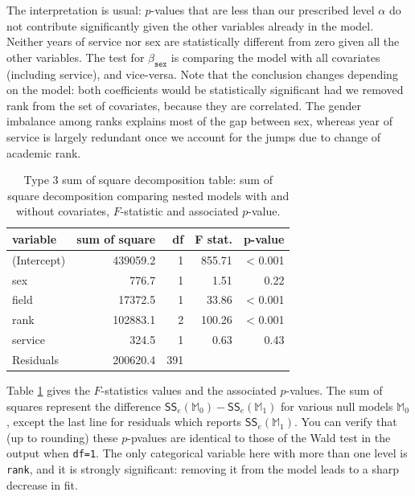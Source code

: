 \documentclass[
  11pt,
  letterpaper,
]{book}
\theoremstyle{definition}
\theoremstyle{definition}
\theoremstyle{definition}
\theoremstyle{remark}
\begin{document}
The interpretation is usual: \(p\)-values that are less than our prescribed level \(\alpha\) do not contribute significantly given the other variables already in the model. Neither years of service nor sex are statistically different from zero given all the other variables. The test for \(\beta_{\texttt{sex}}\) is comparing the model with all covariates (including service), and vice-versa. Note that the conclusion changes depending on the model: both coefficients would be statistically significant had we removed rank from the set of covariates, because they are correlated. The gender imbalance among ranks explains most of the gap between sex, whereas year of service is largely redundant once we account for the jumps due to change of academic rank.

\begin{table}

\caption{\label{tab:summaryanovalmcollege}Type 3 sum of square decomposition table: sum of square decomposition comparing nested models with and without covariates, $F$-statistic and associated $p$-value.}
\centering
\begin{tabular}[t]{lrrrr}
\toprule
variable & sum of square & df & F stat. & p-value\\
\midrule
(Intercept) & 439059.2 & 1 & 855.71 & < 0.001\\
sex & 776.7 & 1 & 1.51 & 0.22\\
field & 17372.5 & 1 & 33.86 & < 0.001\\
rank & 102883.1 & 2 & 100.26 & < 0.001\\
service & 324.5 & 1 & 0.63 & 0.43\\
\addlinespace
Residuals & 200620.4 & 391 &  & \\
\bottomrule
\end{tabular}
\end{table}

Table \ref{tab:summaryanovalmcollege} gives the \(F\)-statistics values and the associated \(p\)-values. The sum of squares represent the difference \(\mathsf{SS}_e(\mathbb{M}_0)-\mathsf{SS}_e(\mathbb{M}_1)\) for various null models \(\mathbb{M}_0\), except the last line for residuals which reports \(\mathsf{SS}_e(\mathbb{M}_1)\). You can verify that (up to rounding) these \(p\)-pvalues are identical to those of the Wald test in the output when \texttt{df=1}. The only categorical variable here with more than one level is \texttt{rank}, and it is strongly significant: removing it from the model leads to a sharp decrease in fit.
\end{document}
